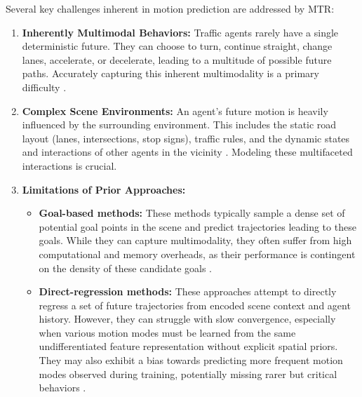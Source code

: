 Several key challenges inherent in motion prediction are addressed by MTR:
\begin{enumerate}
    \item \textbf{Inherently Multimodal Behaviors:} Traffic agents rarely have a single deterministic future. They can choose to turn, continue straight, change lanes, accelerate, or decelerate, leading to a multitude of possible future paths. Accurately capturing this inherent multimodality is a primary difficulty \cite{Shi2022MTR, Shi2022MTR_A}.
    \item \textbf{Complex Scene Environments:} An agent's future motion is heavily influenced by the surrounding environment. This includes the static road layout (lanes, intersections, stop signs), traffic rules, and the dynamic states and interactions of other agents in the vicinity \cite{Shi2022MTR, Shi2022MTR_A}. Modeling these multifaceted interactions is crucial.
    \item \textbf{Limitations of Prior Approaches:}
    \begin{itemize}
        \item \textbf{Goal-based methods:} These methods typically sample a dense set of potential goal points in the scene and predict trajectories leading to these goals. While they can capture multimodality, they often suffer from high computational and memory overheads, as their performance is contingent on the density of these candidate goals \cite{Shi2022MTR, Shi2022MTR_A}.
        \item \textbf{Direct-regression methods:} These approaches attempt to directly regress a set of future trajectories from encoded scene context and agent history. However, they can struggle with slow convergence, especially when various motion modes must be learned from the same undifferentiated feature representation without explicit spatial priors. They may also exhibit a bias towards predicting more frequent motion modes observed during training, potentially missing rarer but critical behaviors \cite{Shi2022MTR, Shi2022MTR_A}.
    \end{itemize}
\end{enumerate}


